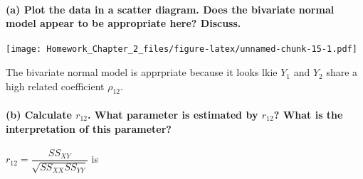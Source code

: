 \documentclass[]{article}
\newenvironment{Shaded}{\begin{snugshade}}{\end{snugshade}}
\newcommand{\KeywordTok}[1]{\textcolor[rgb]{0.13,0.29,0.53}{\textbf{#1}}}
\newcommand{\DataTypeTok}[1]{\textcolor[rgb]{0.13,0.29,0.53}{#1}}
\newcommand{\DecValTok}[1]{\textcolor[rgb]{0.00,0.00,0.81}{#1}}
\newcommand{\StringTok}[1]{\textcolor[rgb]{0.31,0.60,0.02}{#1}}
\newcommand{\OtherTok}[1]{\textcolor[rgb]{0.56,0.35,0.01}{#1}}
\newcommand{\OperatorTok}[1]{\textcolor[rgb]{0.81,0.36,0.00}{\textbf{#1}}}
\newcommand{\NormalTok}[1]{#1}
\let\oldparagraph\paragraph
\renewcommand{\paragraph}[1]{\oldparagraph{#1}\mbox{}}
\begin{document}
\paragraph{(a) Plot the data in a scatter diagram. Does the bivariate
normal model appear to be appropriate here?
Discuss.}\label{a-plot-the-data-in-a-scatter-diagram.-does-the-bivariate-normal-model-appear-to-be-appropriate-here-discuss.}

\begin{Shaded}
\end{Shaded}

\texttt{[image: Homework\_Chapter\_2\_files/figure-latex/unnamed-chunk-15-1.pdf]}

The bivariate normal model is apprpriate because it looks lkie \(Y_1\)
and \(Y_2\) share a high related coefficient \(\rho_{12}.\)

\paragraph{\texorpdfstring{(b) Calculate \(r_{12}\). What parameter is
estimated by \(r_{12}\)? What is the interpretation of this
parameter?}{(b) Calculate r\_\{12\}. What parameter is estimated by r\_\{12\}? What is the interpretation of this parameter?}}\label{b-calculate-r_12.-what-parameter-is-estimated-by-r_12-what-is-the-interpretation-of-this-parameter}

\(r_{12}=\dfrac{SS_{XY}}{\sqrt{SS_{XX}SS_{YY}}}\) is
\end{document}
